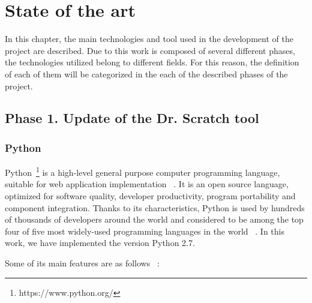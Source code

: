 

\chapter{State of the art}
\label{chap:state}

In this chapter, the main technologies and tool used in the development of the project are described. Due to this work is composed of several different phases, the technologies utilized belong to different fields. For this reason, the definition of each of them will be categorized in the each of the described phases of the project.  

\section{Phase 1. Update of the Dr. Scratch tool}
\label{sec:phase_1}

\subsection{Python} 
\label{subsec:python}

Python~\footnote{https://www.python.org/} is a high-level general purpose computer programming language, suitable for web application implementation ~\cite{kuhlman:python}. It is an open source language, optimized for software quality, developer productivity, program portability and component integration. Thanks to its characteristics, Python is used by hundreds of thousands of developers around the world and considered to be among the top four of five most widely-used programming languages in the world ~\cite{lutz:programming}. In this work, we have implemented the version Python 2.7.

Some of its main features are as follows ~\cite{javatpoint:_python}:

